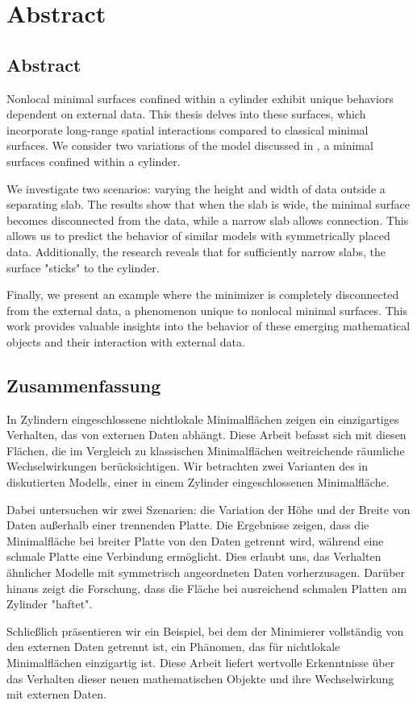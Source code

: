 \chapter{Abstract}
\label{ch:abstract}

\section*{Abstract}
Nonlocal minimal surfaces confined within a cylinder exhibit unique behaviors dependent on
external data. This thesis delves into these surfaces, which incorporate long-range
spatial interactions compared to classical minimal surfaces. We consider two variations of
the model discussed in \cite{dipierro2020disconnectedness}, a minimal surfaces confined
within a cylinder.\newline

We investigate two scenarios: varying the height and width of data outside a separating
slab. The results show that when the slab is wide, the minimal surface becomes
disconnected from the data, while a narrow slab allows connection. This allows us to
predict the behavior of similar models with symmetrically placed data. Additionally, the
research reveals that for sufficiently narrow slabs, the surface "sticks" to the
cylinder.\newline 

Finally, we present an example where the minimizer is completely disconnected from the
external data, a phenomenon unique to nonlocal minimal surfaces. This work provides
valuable insights into the behavior of these emerging mathematical objects and their
interaction with external data.


\section*{Zusammenfassung}
In Zylindern eingeschlossene nichtlokale Minimalflächen zeigen ein einzigartiges
Verhalten, das von externen Daten abhängt. Diese Arbeit befasst sich mit diesen Flächen,
die im Vergleich zu klassischen Minimalflächen weitreichende räumliche Wechselwirkungen
berücksichtigen. Wir betrachten zwei Varianten des in \cite{dipierro2020disconnectedness}
diskutierten Modells, einer in einem Zylinder eingeschlossenen Minimalfläche.\newline

Dabei untersuchen wir zwei Szenarien: die Variation der Höhe und der Breite von Daten
außerhalb einer trennenden Platte. Die Ergebnisse zeigen, dass die Minimalfläche bei
breiter Platte von den Daten getrennt wird, während eine schmale Platte eine Verbindung
ermöglicht. Dies erlaubt uns, das Verhalten ähnlicher Modelle mit symmetrisch angeordneten
Daten vorherzusagen. Darüber hinaus zeigt die Forschung, dass die Fläche bei ausreichend
schmalen Platten am Zylinder "haftet".\newline

Schließlich präsentieren wir ein Beispiel, bei dem der Minimierer vollständig von den
externen Daten getrennt ist, ein Phänomen, das für nichtlokale Minimalflächen einzigartig
ist. Diese Arbeit liefert wertvolle Erkenntnisse über das Verhalten dieser neuen
mathematischen Objekte und ihre Wechselwirkung mit externen Daten.